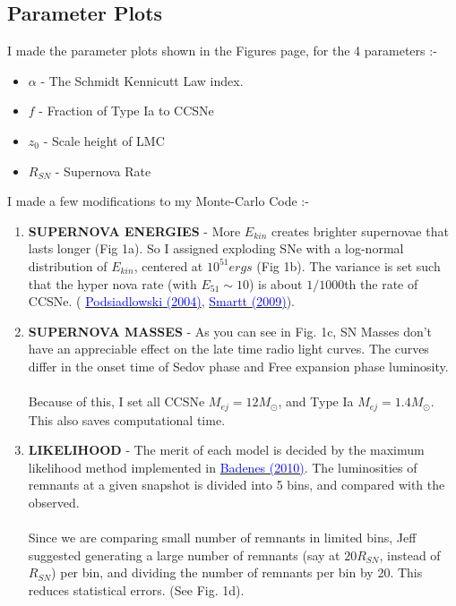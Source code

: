 \documentclass[10pt,a4paper]{article}
\begin{document}
\begin{center}
\section* {Parameter Plots}
\end{center}
I made the parameter plots shown in the Figures page, for the 4 parameters :- 
\begin{itemize}
\item $\alpha$ - The Schmidt Kennicutt Law index.
\item $f$ - Fraction of Type Ia to CCSNe
\item $z_0$ - Scale height of LMC
\item $R_{SN}$ - Supernova Rate
\end{itemize}
I made a few modifications to my Monte-Carlo Code :-
\begin{enumerate}
\item \textbf{SUPERNOVA ENERGIES} - More $E_{kin}$ creates brighter supernovae that lasts longer (Fig 1a). So I assigned exploding SNe with a log-normal distribution of $E_{kin}$, centered at $10^{51} ergs$ (Fig 1b). The variance is set such that the hyper nova rate (with $E_{51} \sim 10$) is about $1/1000$th the rate of CCSNe. ( \href{http://adsabs.harvard.edu/cgi-bin/bib_query?arXiv:astro-ph/0403399}{\textcolor{blue}{Podsiadlowski (2004)}}, \href{http://www.annualreviews.org/doi/abs/10.1146/annurev-astro-082708-101737}{\textcolor{blue}{Smartt (2009)}}).
\item \textbf{SUPERNOVA MASSES} - As you can see in Fig. 1c, SN Masses don't have an appreciable effect on the late time radio light curves. The curves differ in the onset time of Sedov phase and Free expansion phase luminosity.\\\\
Because of this, I set all CCSNe $M_{ej} = 12 M_{\odot}$, and Type Ia $M_{ej} = 1.4 M_{\odot}$. This also saves computational time.
\item \textbf{LIKELIHOOD} - The merit of each model is decided by the maximum likelihood method implemented in \href{http://adsabs.harvard.edu/abs/2010MNRAS.407.1301B}{\textcolor{blue}{Badenes (2010)}}. The luminosities of remnants at a given snapshot is divided into 5 bins, and compared with the observed.\\\\
Since we are comparing small number of remnants in limited bins, Jeff suggested generating a large number of remnants (say at $20 R_{SN}$, instead of $R_{SN}$) per bin, and dividing the number of remnants per bin by 20. This reduces statistical errors. (See Fig. 1d).\\
\end{enumerate}
\end{document}
